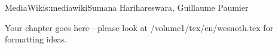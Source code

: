 \begin{aosachapter}{MediaWiki}{s:mediawiki}{Sumana Harihareswara, Guillaume Paumier}

Your chapter goes here---please look at /volume1/tex/en/wesnoth.tex for 
formatting ideas.

\end{aosachapter}
